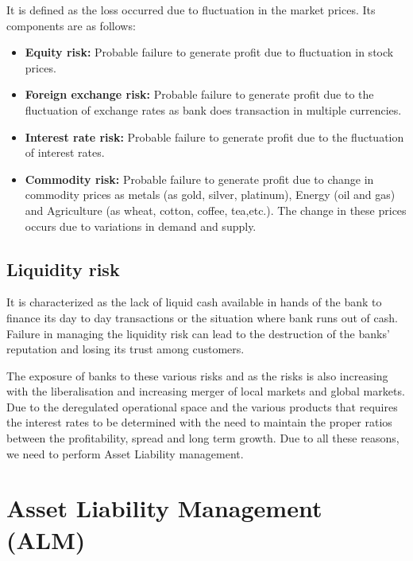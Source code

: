 		It is defined as the loss occurred due to fluctuation in the market prices. Its components are as follows:
		
		\begin{itemize}
		
			\item \textbf{Equity risk: }Probable failure to generate profit due to fluctuation in stock prices.
			
			\item \textbf{Foreign exchange risk: }Probable failure to generate profit due to the fluctuation of exchange rates as bank does transaction in multiple currencies.
			
			\item \textbf{Interest rate risk: }Probable failure to generate profit due to the fluctuation of interest rates.
			
			\item \textbf{Commodity risk: }Probable failure to generate profit due to change in commodity prices as metals (as gold, silver, platinum), Energy (oil and gas) and Agriculture (as wheat, cotton, coffee, tea,etc.). The change in these prices occurs due to variations in demand and supply.

		\end{itemize}

	\subsection{Liquidity risk}

		It is characterized as the lack of liquid cash available in hands of the bank to finance its day to day transactions or the situation where bank runs out of cash. Failure in managing the liquidity risk can lead to the destruction of the banks' reputation and losing its trust among customers.

The exposure of banks to these various risks and as the risks is also increasing with the liberalisation and increasing merger of local markets and global markets. Due to the deregulated operational space and the various products that requires the interest rates to be determined with the need to maintain the proper ratios between the profitability, spread and long term growth. Due to all these reasons, we need to perform Asset Liability management.


	
\section{Asset Liability Management (ALM)}

